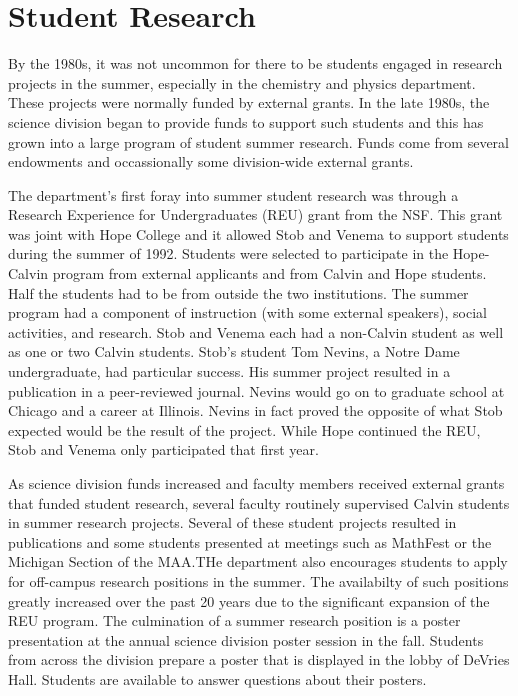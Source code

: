 \documentclass[
]{book}
\begin{document}
\hypertarget{student-research}{%
\section{Student Research}\label{student-research}}

By the 1980s, it was not uncommon for there to be students engaged in research projects in the summer, especially in the chemistry and physics department. These projects were normally funded by external grants. In the late 1980s, the science division began to provide funds to support such students and this has grown into a large program of student summer research. Funds come from several endowments and occassionally some division-wide external grants.

The department's first foray into summer student research was through a Research Experience for Undergraduates (REU) grant from the NSF. This grant was joint with Hope College and it allowed Stob and Venema to support students during the summer of 1992. Students were selected to participate in the Hope-Calvin program from external applicants and from Calvin and Hope students. Half the students had to be from outside the two institutions. The summer program had a component of instruction (with some external speakers), social activities, and research. Stob and Venema each had a non-Calvin student as well as one or two Calvin students. Stob's student Tom Nevins, a Notre Dame undergraduate, had particular success. His summer project resulted in a publication in a peer-reviewed journal. Nevins would go on to graduate school at Chicago and a career at Illinois. Nevins in fact proved the opposite of what Stob expected would be the result of the project. While Hope continued the REU, Stob and Venema only participated that first year.

As science division funds increased and faculty members received external grants that funded student research, several faculty routinely supervised Calvin students in summer research projects. Several of these student projects resulted in publications and some students presented at meetings such as MathFest or the Michigan Section of the MAA.THe department also encourages students to apply for off-campus research positions in the summer. The availabilty of such positions greatly increased over the past 20 years due to the significant expansion of the REU program. The culmination of a summer research position is a poster presentation at the annual science division poster session in the fall. Students from across the division prepare a poster that is displayed in the lobby of DeVries Hall. Students are available to answer questions about their posters.
\end{document}
